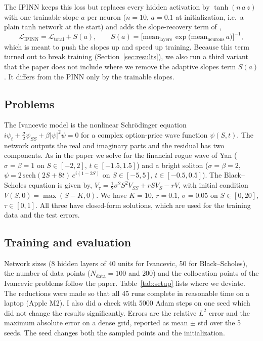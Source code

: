 \documentclass[10pt]{article}
\begin{document}
The IPINN keeps this loss but replaces every hidden activation by $\tanh(n\,a\,z)$ with one trainable
slope $a$ per neuron ($n=10$, $a=0.1$ at initialization, i.e.\ a plain tanh network at the start) and adds
the slope-recovery term of \cite{jagtap2020},
\begin{equation}
  \mathcal{L}_{\text{IPINN}} = \mathcal{L}_{\text{total}} + S(a), \qquad
  S(a) = \Big[\text{mean}_{\text{layers}}\, \exp\big(\text{mean}_{\text{neurons}}\, a\big)\Big]^{-1},
  \label{eq:sr}
\end{equation}
which is meant to push the slopes up and speed up training. Because this term turned out to break
training (Section~\ref{sec:results}), we also run a third variant that the paper does not include where we
remove the adaptive slopes term $S(a)$. It differs from the PINN only by
the trainable slopes.

\subsection{Problems}

The Ivancevic model is the nonlinear Schr\"odinger equation
$i\psi_t + \tfrac{\sigma}{2}\psi_{SS} + \beta|\psi|^2\psi = 0$ for a complex option-price wave function
$\psi(S,t)$. The network outputs the real and imaginary parts and the residual has two components.
As in the paper we solve for the financial rogue wave of Yan \cite{yan2010}
($\sigma=\beta=1$ on $S\in[-2,2]$, $t\in[-1.5,1.5]$) and a bright soliton
($\sigma=\beta=2$, $\psi = 2\,\mathrm{sech}(2S+8t)\,e^{i(1-2S)}$ on $S\in[-5,5]$, $t\in[-0.5,0.5]$).
The Black--Scholes equation is given by, $V_\tau = \tfrac12\sigma^2 S^2 V_{SS} + rSV_S - rV$, with initial condition $V(S,0)=\max(S-K,0)$. We have
$K=10$, $r=0.1$, $\sigma=0.05$ on $S\in[0,20]$, $\tau\in[0,1]$. All three have closed-form solutions,
which are used for the training data and the test errors.

\subsection{Training and evaluation}

Network sizes (8 hidden layers of 40 units for Ivancevic, 50 for Black--Scholes), the number of data
points ($N_{\text{data}} = 100$ and $200$) and the collocation points of the Ivancevic problems follow the
paper. Table~\ref{tab:setup} lists where we deviate. The reductions were made so that all 45 runs complete in
reasonable time on a laptop (Apple M2). I also did a check with 5000 Adam steps on one seed which did not
change the results significantly. Errors are the relative $L^2$ error and the maximum absolute error on a
dense grid, reported as mean $\pm$ std over the 5 seeds. The seed changes both the sampled points and
the initialization.
\end{document}
